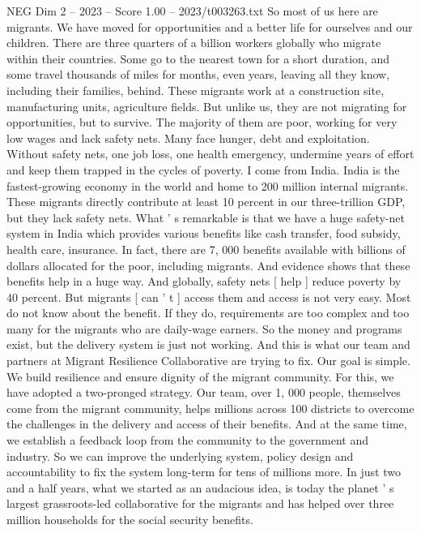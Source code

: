 \begin{textsample}{NEG Dim 2 – 2023 – Score 1.00 – 2023/t003263.txt}  \label{ex:f2_neg_049}
So most of us here are migrants.
We have moved for opportunities and a better life for ourselves and our children.
There are three quarters of a billion workers globally who migrate within their countries.
Some go to the nearest town for a short duration, and some travel thousands of miles for months, even years, leaving all they know, including their families, behind.
These migrants work at a construction site, manufacturing units, agriculture fields.
But unlike us, they are not migrating for opportunities, but to survive.
The majority of them are poor, working for very low wages and lack safety nets.
Many face hunger, debt and exploitation.
Without safety nets, one job loss, one health emergency, undermine years of effort and keep them trapped in the cycles of poverty.
I come from India.
India is the fastest-growing economy in the world and home to 200 million internal migrants.
These migrants directly contribute at least 10 percent in our three-trillion GDP, but they lack safety nets.
What ' s remarkable is that we have a huge safety-net system in India which provides various benefits like cash transfer, food subsidy, health care, insurance.
In fact, there are 7, 000 benefits available with billions of dollars allocated for the poor, including migrants.
And evidence shows that these benefits help in a huge way.
And globally, safety nets [ help ] reduce poverty by 40 percent.
But migrants [ can ' t ] access them and access is not very easy.
Most do not know about the benefit.
If they do, requirements are too complex and too many for the migrants who are daily-wage earners.
So the money and programs exist, but the delivery system is just not working.
And this is what our team and partners at Migrant Resilience Collaborative are trying to fix.
Our goal is simple.
We build resilience and ensure dignity of the migrant community.
For this, we have adopted a two-pronged strategy.
Our team, over 1, 000 people, themselves come from the migrant community, helps millions across 100 districts to overcome the challenges in the delivery and access of their benefits.
And at the same time, we establish a feedback loop from the community to the government and industry.
So we can improve the underlying system, policy design and accountability to fix the system long-term for tens of millions more.
In just two and a half years, what we started as an audacious idea, is today the planet ' s largest grassroots-led collaborative for the migrants and has helped over three million households for the social security benefits.

\end{textsample}
